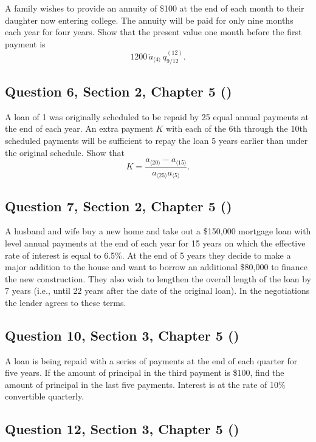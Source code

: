 \documentclass[12pt, a4paper]{article}
\newcommand{\angl}[1]{\langle #1 \rangle}
\begin{document}
\noindent A family wishes to provide an annuity of \$100 at the end of each month to their daughter now entering college. The annuity will be paid for only nine months each year for four years. Show that the present value one month before the first payment is
\[
1200 \, \ddot{a}_{\angl{4}} \, q^{(12)}_{9/12}.
\]

\subsection*{Question 6, Section 2, Chapter 5  (\cite{toi3rd})}

\noindent A loan of 1 was originally scheduled to be repaid by 25 equal annual payments at the end of each year. An extra payment \( K \) with each of the 6th through the 10th scheduled payments will be sufficient to repay the loan 5 years earlier than under the original schedule. Show that
\[
K = \frac{a_{\angl{20}} - a_{\angl{15}}}{a_{\angl{25}} a_{\angl{5}}}.
\]

\subsection*{Question 7, Section 2, Chapter 5  (\cite{toi3rd})}

\noindent A husband and wife buy a new home and take out a \$150{,}000 mortgage loan with level annual payments at the end of each year for 15 years on which the effective rate of interest is equal to 6.5\%. At the end of 5 years they decide to make a major addition to the house and want to borrow an additional \$80{,}000 to finance the new construction. They also wish to lengthen the overall length of the loan by 7 years (i.e., until 22 years after the date of the original loan). In the negotiations the lender agrees to these terms.

\subsection*{Question 10, Section 3, Chapter 5  (\cite{toi3rd})}

\noindent A loan is being repaid with a series of payments at the end of each quarter for five years. If the amount of principal in the third payment is \$100, find the amount of principal in the last five payments. Interest is at the rate of 10\% convertible quarterly.

\subsection*{Question 12, Section 3, Chapter 5  (\cite{toi3rd})}
\end{document}
